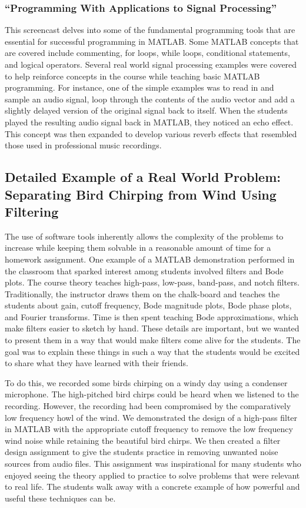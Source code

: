 \documentclass[a4paper,10pt]{article}
\begin{document}
\subsubsection{``Programming With Applications to Signal Processing''} 
This screencast delves into some of the fundamental programming tools that are essential for successful programming in MATLAB.  Some MATLAB concepts that are covered include commenting, for loops, while loops, conditional statements, and logical operators. Several real world signal processing examples were covered to help reinforce concepts in the course while teaching basic MATLAB programming. For instance, one of the simple examples was to read in and sample an audio signal, loop through the contents of the audio vector and add a slightly delayed version of the original signal back to itself.  When the students played the resulting audio signal back in MATLAB, they noticed an echo effect. This concept was then expanded to develop various reverb effects that resembled those used in professional music recordings.      

\subsection{Detailed Example of a Real World Problem: Separating Bird Chirping from Wind Using Filtering}

The use of software tools inherently allows the complexity of the problems to increase while keeping them solvable in a reasonable amount of time for a homework assignment. One example of a MATLAB demonstration performed in the classroom that sparked interest among students involved filters and Bode plots.  The course theory teaches high-pass, low-pass, band-pass, and notch filters. Traditionally, the instructor draws them on the chalk-board and teaches the students about gain, cutoff frequency, Bode magnitude plots, Bode phase plots, and Fourier transforms. Time is then spent teaching Bode approximations, which make filters easier to sketch by hand. These details are important, but we wanted to present them in a way that would make filters come alive for the students.  The goal was to explain these things in such a way that the students would be excited to share what they have learned with their friends.

To do this, we recorded some birds chirping on a windy day using a condenser microphone. The high-pitched bird chirps could be heard when we listened to the recording.  However, the recording had been compromised by the comparatively low frequency howl of the wind.  We demonstrated the design of a high-pass filter in MATLAB with the appropriate cutoff frequency to remove the low frequency wind noise while retaining the beautiful bird chirps. We then created a filter design assignment to give the students practice in removing unwanted noise sources from audio files. This assignment was inspirational for many students who enjoyed seeing the theory applied to practice to solve problems that were relevant to real life. The students walk away with a concrete example of how powerful and useful these techniques can be.
\end{document}
